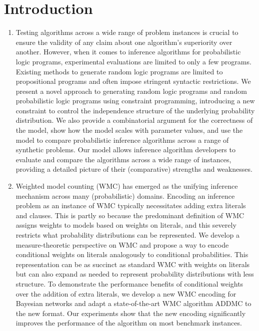 \chapter{Introduction}

\begin{enumerate}
\item Testing algorithms across a wide range of problem instances is crucial to ensure the validity of any claim about one algorithm's superiority over another. However, when it comes to inference algorithms for probabilistic logic programs, experimental evaluations are limited to only a few programs. Existing methods to generate random logic programs are limited to propositional programs and often impose stringent syntactic restrictions. We present a novel approach to generating random logic programs and random probabilistic logic programs using constraint programming, introducing a new constraint to control the independence structure of the underlying probability distribution. We also provide a combinatorial argument for the correctness of the model, show how the model scales with parameter values, and use the model to compare probabilistic inference algorithms across a range of synthetic problems. Our model allows inference algorithm developers to evaluate and compare the algorithms across a wide range of instances, providing a detailed picture of their (comparative) strengths and weaknesses.
\item Weighted model counting (WMC) has emerged as the unifying inference mechanism across many (probabilistic) domains. Encoding an inference problem as an instance of WMC typically necessitates adding extra literals and clauses. This is partly so because the predominant definition of WMC assigns weights to models based on weights on literals, and this severely restricts what probability distributions can be represented. We develop a measure-theoretic perspective on WMC and propose a way to encode conditional weights on literals analogously to conditional probabilities. This representation can be as succinct as standard WMC with weights on literals but can also expand as needed to represent probability distributions with less structure. To demonstrate the performance benefits of conditional weights over the addition of extra literals, we develop a new WMC encoding for Bayesian networks and adapt a state-of-the-art WMC algorithm \textsf{ADDMC} to the new format. Our experiments show that the new encoding significantly improves the performance of the algorithm on most benchmark instances.

\end{enumerate}
